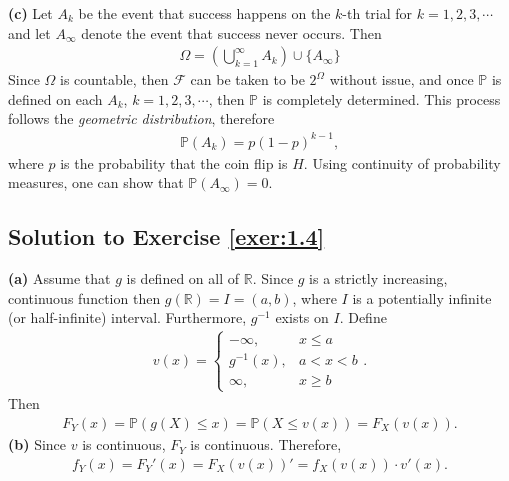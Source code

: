 \documentclass[12pt]{book}
\numberwithin{equation}{chapter}
\theoremstyle{plain}
\numberwithin{theorem}{section}
\theoremstyle{definition}
\numberwithin{exercise}{chapter}
\newcommand{\<}{\langle}
\renewcommand{\>}{\rangle}
\renewcommand{\(}{\left(}
\renewcommand{\)}{\right)}
\renewcommand{\[}{\left[}
\renewcommand{\]}{\right]}
\newcommand\Pb{\mathds{P}}
\newcommand\Rb{\mathds{R}}
\newcommand\Fc{\mathscr{F}}
\newcommand\Om{\Omega}
\begin{document}
\textbf{(c)}
Let $A_k$ be the event that success happens on the $k$-th trial for $k = 1,2,3,\cdots$ and let $A_\infty$ 
denote the event that success never occurs. Then
\begin{align}
\Om
	= \( \bigcup_{k=1}^\infty A_k \) \cup \{ A_\infty \}
\end{align}
Since $\Om$ is countable, then $\Fc$ can be taken to be $2^\Om$ without issue, and once $\Pb$ is defined on each $A_k$, $k = 1,2,3,\cdots$, then $\Pb$ is completely determined. This process follows the \textit{geometric distribution}, therefore
\begin{align}
\Pb( A_k)
	= p(1 - p)^{k-1},
\end{align}
where $p$ is the probability that the coin flip is $H$. Using continuity of probability measures, one can show that 
$\Pb( A_\infty) = 0$. 

\subsection*{Solution to Exercise \ref{exer:1.4}}
\textbf{(a)}
Assume that $g$ is defined on all of $\Rb$. Since $g$ is a strictly increasing, continuous function then $g(\Rb) = I = (a,b)$, where $I$ is a potentially infinite (or half-infinite) interval. Furthermore, $g^{-1}$ exists on $I$. Define 
\begin{align}
v(x) 
	= \left\{
	\begin{array}{lr}
	 -\infty, & x \leq a \\
	 g^{-1}(x), & a < x < b \\
	 \infty, & x \geq b
	\end{array}
	\right. .
\end{align}
Then 
\begin{align}
F_Y(x)
	=\Pb( g(X) \leq x)
	= \Pb( X \leq v(x) )
	= F_X(v(x)).
\end{align}
\textbf{(b)}
Since $v$ is continuous, $F_Y$ is continuous. Therefore, 
\begin{align}
f_Y(x) 
	= F_Y'(x) 
	= F_X(v(x))'
	= f_X(v(x))\cdot v'(x).
\end{align}
\end{document}
